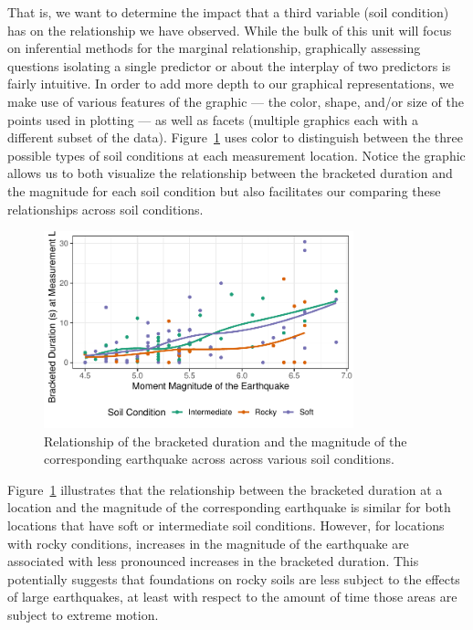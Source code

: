 \documentclass[
  letterpaper,
  DIV=11,
  numbers=noendperiod]{scrreprt}
\theoremstyle{definition}
\theoremstyle{definition}
\theoremstyle{plain}
\theoremstyle{remark}
\begin{document}
That is, we want to determine the impact that a third variable (soil
condition) has on the relationship we have observed. While the bulk of
this unit will focus on inferential methods for the marginal
relationship, graphically assessing questions isolating a single
predictor or about the interplay of two predictors is fairly intuitive.
In order to add more depth to our graphical representations, we make use
of various features of the graphic --- the color, shape, and/or size of
the points used in plotting --- as well as facets (multiple graphics
each with a different subset of the data).
Figure~\ref{fig-regsummaries-color} uses color to distinguish between
the three possible types of soil conditions at each measurement
location. Notice the graphic allows us to both visualize the
relationship between the bracketed duration and the magnitude for each
soil condition but also facilitates our comparing these relationships
across soil conditions.

\begin{figure}

{\centering \includegraphics[width=0.8\textwidth,height=\textheight]{./images/fig-regsummaries-color-1.pdf}

}

\caption{\label{fig-regsummaries-color}Relationship of the bracketed
duration and the magnitude of the corresponding earthquake across across
various soil conditions.}

\end{figure}

Figure~\ref{fig-regsummaries-color} illustrates that the relationship
between the bracketed duration at a location and the magnitude of the
corresponding earthquake is similar for both locations that have soft or
intermediate soil conditions. However, for locations with rocky
conditions, increases in the magnitude of the earthquake are associated
with less pronounced increases in the bracketed duration. This
potentially suggests that foundations on rocky soils are less subject to
the effects of large earthquakes, at least with respect to the amount of
time those areas are subject to extreme motion.
\end{document}
